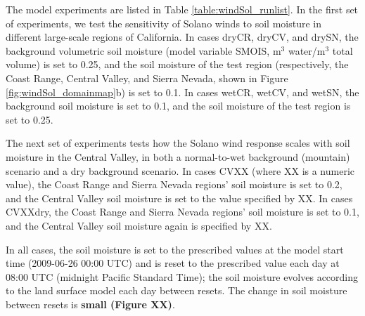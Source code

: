 The model experiments are listed in Table \ref{table:windSol_runlist}.  In the first set of experiments, we test the sensitivity of Solano winds to soil moisture in different large-scale regions of California.  In cases dryCR, dryCV, and drySN, the background volumetric soil moisture (model variable SMOIS, m$^3$ water/m$^3$ total volume) is set to 0.25, and the soil moisture of the test region (respectively, the Coast Range, Central Valley, and Sierra Nevada, shown in Figure \ref{fig:windSol_domainmap}b) is set to 0.1.  In cases wetCR, wetCV, and wetSN, the background soil moisture is set to 0.1, and the soil moisture of the test region is set to 0.25.

The next set of experiments tests how the Solano wind response scales with soil moisture in the Central Valley, in both a normal-to-wet background (mountain) scenario and a dry background scenario.  In cases CVXX (where XX is a numeric value), the Coast Range and Sierra Nevada regions' soil moisture is set to 0.2, and the Central Valley soil moisture is set to the value specified by XX.  In cases CVXXdry, the Coast Range and Sierra Nevada regions' soil moisture is set to 0.1, and the Central Valley soil moisture again is specified by XX.

In all cases, the soil moisture is set to the prescribed values at the model start time (2009-06-26 00:00 UTC) and is reset to the prescribed value each day at 08:00 UTC (midnight Pacific Standard Time); the soil moisture evolves according to the land surface model each day between resets.  The change in soil moisture between resets is \textbf{small (Figure XX)}.

